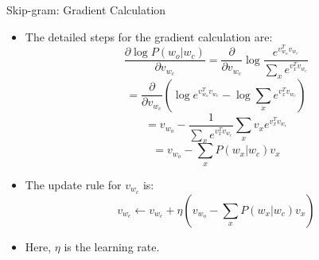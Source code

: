\documentclass[serif, aspectratio=169]{beamer}
\begin{document}



\begin{frame}{Skip-gram: Gradient Calculation}
    \begin{itemize}
        \item The detailed steps for the gradient calculation are:
        \[
        \frac{\partial \log P(w_o | w_c)}{\partial v_{w_c}} = \frac{\partial}{\partial v_{w_c}} \log \frac{e^{v_{w_o}^T v_{w_c}}}{\sum_x e^{v_x^T v_{w_c}}}
        \]
        \[
        = \frac{\partial}{\partial v_{w_c}} \left( \log e^{v_{w_o}^T v_{w_c}} - \log \sum_x e^{v_x^T v_{w_c}} \right)
        \]
        \[
        = v_{w_o} - \frac{1}{\sum_x e^{v_x^T v_{w_c}}} \sum_x v_x e^{v_x^T v_{w_c}}
        \]
        \[
        = v_{w_o} - \sum_x P(w_x | w_c) v_x
        \]
        \item The update rule for \(v_{w_c}\) is:
        \[
        v_{w_c} \leftarrow v_{w_c} + \eta \left( v_{w_o} - \sum_x P(w_x | w_c) v_x \right)
        \]
        \item Here, \(\eta\) is the learning rate.
    \end{itemize}
\end{frame}


\end{document}
